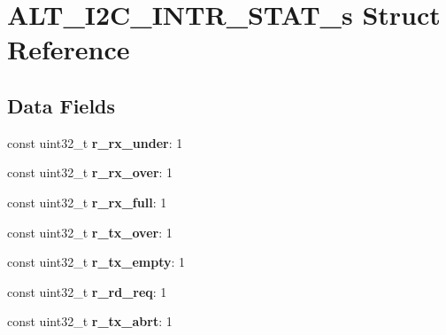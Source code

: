 \hypertarget{structALT__I2C__INTR__STAT__s}{}\section{A\+L\+T\+\_\+\+I2\+C\+\_\+\+I\+N\+T\+R\+\_\+\+S\+T\+A\+T\+\_\+s Struct Reference}
\label{structALT__I2C__INTR__STAT__s}
\subsection*{Data Fields}
\begin{DoxyCompactItemize}
\item 
\mbox{\label{structALT__I2C__INTR__STAT__s_aa667cee6ac30b8d949eaa36818de6375}} 
const uint32\+\_\+t {\bfseries r\+\_\+rx\+\_\+under}\+: 1
\item 
\mbox{\label{structALT__I2C__INTR__STAT__s_a4decfd03a38c05583890df787c62fb7f}} 
const uint32\+\_\+t {\bfseries r\+\_\+rx\+\_\+over}\+: 1
\item 
\mbox{\label{structALT__I2C__INTR__STAT__s_a5e7a7098a161a0a027342d6cd575b778}} 
const uint32\+\_\+t {\bfseries r\+\_\+rx\+\_\+full}\+: 1
\item 
\mbox{\label{structALT__I2C__INTR__STAT__s_a86356ffb072fb9fef6b8215244b44928}} 
const uint32\+\_\+t {\bfseries r\+\_\+tx\+\_\+over}\+: 1
\item 
\mbox{\label{structALT__I2C__INTR__STAT__s_aa891522af025793ee72ac5165b21a10c}} 
const uint32\+\_\+t {\bfseries r\+\_\+tx\+\_\+empty}\+: 1
\item 
\mbox{\label{structALT__I2C__INTR__STAT__s_a8db0e4f9e756dcc2b57b57b92494d3fc}} 
const uint32\+\_\+t {\bfseries r\+\_\+rd\+\_\+req}\+: 1
\item 
\mbox{\label{structALT__I2C__INTR__STAT__s_a0dffaadf694e9869b9c59478a72c0f3e}} 
const uint32\+\_\+t {\bfseries r\+\_\+tx\+\_\+abrt}\+: 1
\item 
\mbox{\label{structALT__I2C__INTR__STAT__s_a03de5d57aa7b3eca17c6b7457772f397}} 

\end{DoxyCompactItemize}
